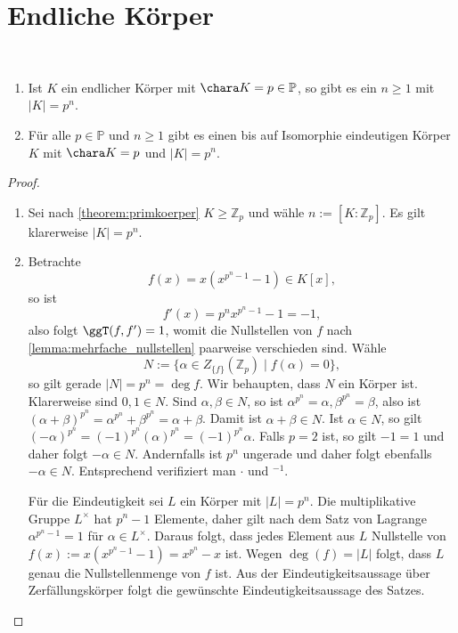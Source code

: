 \section{Endliche Körper}

\begin{theorem}{\ }\label{theorem:endliche_koerper_eindeutigkeit}
    \begin{enumerate}
        \item Ist $K$ ein endlicher Körper mit $\chara K = p \in \mathbb{P}$, so gibt es ein $n \geq 1$ mit $\vert K \vert = p^n$.
        \item Für alle $p \in \mathbb{P}$ und $n \geq 1$ gibt es einen bis auf Isomorphie eindeutigen Körper $K$ mit $\chara K = p$ und $\vert K \vert = p^n$.
    \end{enumerate}
\end{theorem}

\begin{proof}{\ }
    \begin{enumerate}
        \item Sei nach \cref{theorem:primkoerper} $K \geq \mathbb{Z}_p$ und wähle $n := [K : \mathbb{Z}_p]$. Es gilt klarerweise $\vert K \vert = p^n$.
        \item Betrachte
        $$ f(x) = x(x^{p^n - 1} - 1)\in K[x], $$
        so ist
        $$ f'(x) = p^n x^{p^n - 1} - 1 = -1, $$
        also folgt $\ggT(f, f') = 1$, womit die Nullstellen von $f$ nach \cref*{lemma:mehrfache_nullstellen} paarweise verschieden sind. Wähle
        $$ N := \{ \alpha \in Z_{\{f\}}(\mathbb{Z}_p) \mid f(\alpha) = 0 \}, $$
        so gilt gerade $\vert N \vert = p^n = \deg f$. Wir behaupten, dass $N$ ein Körper ist. Klarerweise sind $0, 1 \in N$. Sind $\alpha, \beta \in N$, so ist $\alpha^{p^n} = \alpha, \beta^{p^n} = \beta$, also ist $(\alpha + \beta)^{p^n} = \alpha^{p^n} + \beta^{p^n} = \alpha + \beta$. Damit ist $\alpha + \beta \in N$. 
        Ist $\alpha\in N$, so gilt $(-\alpha)^{p^n}=(-1)^{p^n}(\alpha)^{p^n}=(-1)^{p^n}\alpha$. Falls $p=2$ ist, so gilt $-1=1$ und daher folgt $-\alpha\in N$. Andernfalls ist $p^n$ ungerade und daher folgt ebenfalls $-\alpha\in N$.
        Entsprechend verifiziert man $\cdot$ und ${}^{-1}$.

        Für die Eindeutigkeit sei $L$ ein Körper mit $|L|=p^n$. Die multiplikative Gruppe $L^\times$ hat $p^n-1$ Elemente, daher gilt nach dem Satz von Lagrange $\alpha^{p^n-1}=1$ für $\alpha\in L^\times$. Daraus folgt, dass jedes Element aus $L$ Nullstelle von $f(x):=x(x^{p^n-1}-1)=x^{p^n}-x$ ist. Wegen $\deg(f)=|L|$ folgt, dass $L$ genau die Nullstellenmenge von $f$ ist. Aus der Eindeutigkeitsaussage über Zerfällungskörper folgt die gewünschte Eindeutigkeitsaussage des Satzes.
    \end{enumerate}
\end{proof}

